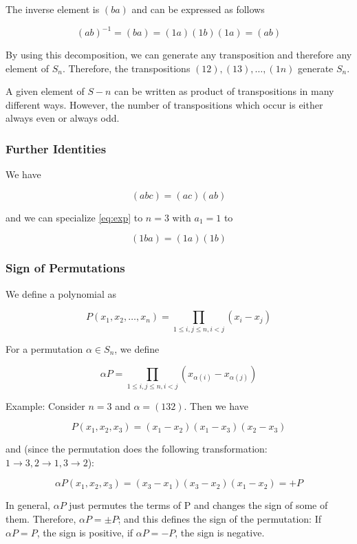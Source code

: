 The inverse element is \((ba)\) and can be expressed as follows

\[
(ab)^{-1} = (ba) = (1a)(1b)(1a) = (ab)
\]

By using this decomposition, we can generate any transposition and
therefore any element of \(S_n\). Therefore, the transpositions
\((1 2),(1 3), \ldots, (1 n)\) generate \(S_n\).

A given element of \(S-n\) can be written as product of transpositions
in many different ways. However, the number of transpositions which
occur is either always even or always odd.

\subsubsection{Further Identities}\label{further-identities}

We have

\[
(abc) = (ac)(ab)
\]

and we can specialize \eqref{eq:exp} to \(n=3\) with \(a_1 = 1\) to

\begin{equation}
\label{eq:exp3}
(1ba) = (1a)(1b)
\end{equation}

\subsubsection{Sign of Permutations}\label{sign-of-permutations}

We define a polynomial as

\[
P(x_1,x_2,\ldots,x_n) = \prod_{1 \leq i,j \leq n, i < j} (x_i - x_j)
\]

For a permutation \(\alpha \in S_n\), we define

\[
\alpha P = \prod_{1 \leq i,j \leq n, i < j} (x_{\alpha(i)} - x_{\alpha(j)})
\]

Example: Consider \(n = 3\) and \(\alpha = (132)\). Then we have

\[
P(x_1, x_2, x_3) = (x_1 - x_2)(x_1 - x_3)(x_2 - x_3)
\]

and (since the permutation does the following transformation:
\(1 \rightarrow 3, 2 \rightarrow 1, 3 \rightarrow 2\)):

\[
\alpha P(x_1, x_2, x_3) = (x_3 - x_1)(x_3 - x_2)(x_1 - x_2) = + P
\]

In general, \(\alpha P\) just permutes the terms of P and changes the
sign of some of them. Therefore, \(\alpha P = \pm P\); and this defines
the sign of the permutation: If \(\alpha P = P\), the sign is positive,
if \(\alpha P = -P\), the sign is negative.

